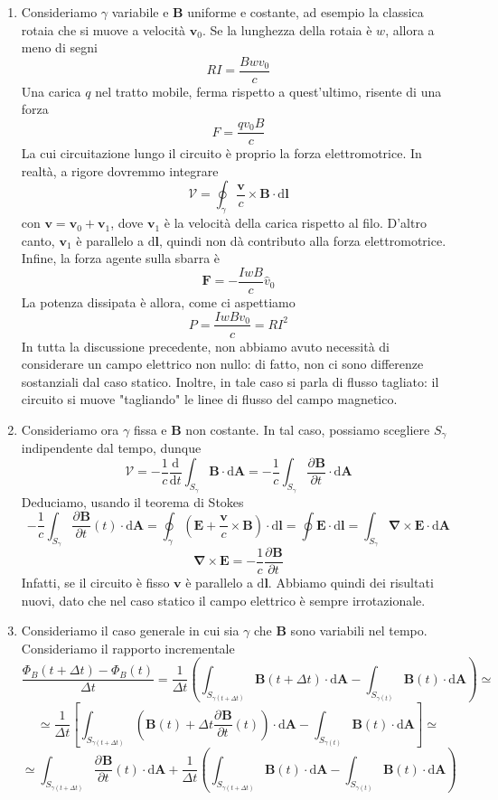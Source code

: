 \documentclass[a4paper,11pt]{book}
\newcommand{\dif}{\mathrm{d}}
\newcommand{\der}[3][]{\frac{\partial ^{#1}#2}{\partial {#3}^{#1}}}
\let\oldnabla\nabla
\renewcommand{\nabla}{\vec{\oldnabla}}
\renewcommand{\vec}[1]{\mathbf{#1}}
\theoremstyle{theorem}
\theoremstyle{definition}
\begin{document}
\begin{enumerate}
	\item Consideriamo $\gamma$ variabile e $\vec{B}$ uniforme e costante, ad esempio la classica rotaia che si muove a velocità $\vec{v}_0$. Se la lunghezza della rotaia è $w$, allora a meno di segni
	\[RI=\frac{Bwv_0}{c}\]
	Una carica $q$ nel tratto mobile, ferma rispetto a quest'ultimo, risente di una forza
	\[F=\frac{qv_0B}{c}\]
	La cui circuitazione lungo il circuito è proprio la forza elettromotrice. In realtà, a rigore dovremmo integrare
	\[\mathcal{V}=\oint_\gamma\frac{\vec{v}}{c}\times\vec{B}\cdot\dif\vec{l}\]
	con $\vec{v}=\vec{v}_0+\vec{v}_1$, dove $\vec{v}_1$ è la velocità della carica rispetto al filo. D'altro canto, $\vec{v}_1$ è parallelo a $\dif\vec{l}$, quindi non dà contributo alla forza elettromotrice. Infine, la forza agente sulla sbarra è
	\[\vec{F}=-\frac{IwB}{c}\hat{v}_0\]
	La potenza dissipata è allora, come ci aspettiamo
	\[P=\frac{IwBv_0}{c}=RI^2\]
	In tutta la discussione precedente, non abbiamo avuto necessità di considerare un campo elettrico non nullo: di fatto, non ci sono differenze sostanziali dal caso statico. Inoltre, in tale caso si parla di flusso tagliato: il circuito si muove "tagliando" le linee di flusso del campo magnetico.
	\item Consideriamo ora $\gamma$ fissa e $\vec{B}$ non costante. In tal caso, possiamo scegliere $S_{\gamma}$ indipendente dal tempo, dunque
	\[\mathcal{V}=-\frac{1}{c}\frac{\dif }{\dif t}\int_{S_\gamma}\vec{B}\cdot\dif\vec{A}=-\frac{1}{c}\int_{S_\gamma}\der{\vec{B}}{t}\cdot\dif\vec{A}\]
	Deduciamo, usando il teorema di Stokes
	\[-\frac{1}{c}\int_{S_\gamma}\der{\vec{B}}{t}(t)\cdot\dif\vec{A}=\oint_{\gamma}\left(\vec{E}+\frac{\vec{v}}{c}\times\vec{B}\right)\cdot\dif\vec{l}=\oint\vec{E}\cdot\dif\vec{l}=\int_{S_\gamma}\nabla\times\vec{E}\cdot\dif\vec{A}\]
	\[\nabla\times\vec{E}=-\frac{1}{c}\der{\vec{B}}{t}\]
	Infatti, se il circuito è fisso $\vec{v}$ è parallelo a $\dif\vec{l}$. Abbiamo quindi dei risultati nuovi, dato che nel caso statico il campo elettrico è sempre irrotazionale.
	\item Consideriamo il caso generale in cui sia $\gamma$ che $\vec{B}$ sono variabili nel tempo. Consideriamo il rapporto incrementale
	\[\frac{\Phi_B(t+\Delta t)-\Phi_B(t)}{\Delta t}=\frac{1}{\Delta t}\left(\int_{S_{\gamma(t+\Delta t)}}\vec{B}(t+\Delta t)\cdot\dif\vec{A}-\int_{S_{\gamma(t)}}\vec{B}(t)\cdot\dif\vec{A}\right)\simeq\]
	\[\simeq\frac{1}{\Delta t}\left[\int_{S_{\gamma(t+\Delta t)}}\left(\vec{B}(t)+\Delta t\der{\vec{B}}{t}(t)\right)\cdot\dif\vec{A}-\int_{S_{\gamma(t)}}\vec{B}(t)\cdot\dif\vec{A}\right]\simeq\]\[\simeq\int_{S_{\gamma(t+\Delta t)}}\der{\vec{B}}{t}(t)\cdot\dif\vec{A}+\frac{1}{\Delta t}\left(\int_{S_{\gamma(t+\Delta t)}}\vec{B}(t)\cdot\dif\vec{A}-\int_{S_{\gamma(t)}}\vec{B}(t)\cdot\dif\vec{A}\right)\]

\end{enumerate}
\end{document}
